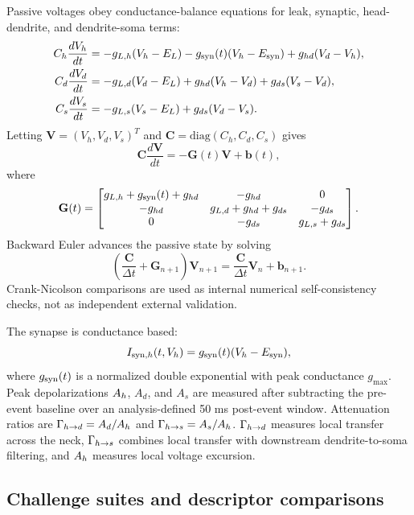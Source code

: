 Passive voltages obey conductance-balance equations for leak, synaptic, head-dendrite, and dendrite-soma terms:
\begin{align}
C_h\frac{dV_h}{dt} &=
-g_{L,h}(V_h-E_L)-g_{\mathrm{syn}}(t)(V_h-E_{\mathrm{syn}})+g_{hd}(V_d-V_h),\\
C_d\frac{dV_d}{dt} &=
-g_{L,d}(V_d-E_L)+g_{hd}(V_h-V_d)+g_{ds}(V_s-V_d),\\
C_s\frac{dV_s}{dt} &=
-g_{L,s}(V_s-E_L)+g_{ds}(V_d-V_s).
\end{align}
Letting $\mathbf{V}=(V_h,V_d,V_s)^T$ and $\mathbf{C}=\mathrm{diag}(C_h,C_d,C_s)$ gives
\begin{equation}
\mathbf{C}\frac{d\mathbf{V}}{dt}= -\mathbf{G}(t)\mathbf{V}+\mathbf{b}(t),
\end{equation}
where
\begin{equation}
\mathbf{G}(t)=
\begin{bmatrix}
g_{L,h}+g_{\mathrm{syn}}(t)+g_{hd} & -g_{hd} & 0\\
-g_{hd} & g_{L,d}+g_{hd}+g_{ds} & -g_{ds}\\
0 & -g_{ds} & g_{L,s}+g_{ds}
\end{bmatrix}.
\label{eq:matrix}
\end{equation}
Backward Euler advances the passive state by solving
\begin{equation}
\left(\frac{\mathbf{C}}{\Delta t}+\mathbf{G}_{n+1}\right)\mathbf{V}_{n+1}
=
\frac{\mathbf{C}}{\Delta t}\mathbf{V}_n+\mathbf{b}_{n+1}.
\end{equation}
Crank-Nicolson comparisons are used as internal numerical self-consistency checks, not as independent external validation.

The synapse is conductance based:
\begin{equation}
I_{\mathrm{syn},h}(t,V_h)=g_{\mathrm{syn}}(t)(V_h-E_{\mathrm{syn}}),
\end{equation}
where $g_{\mathrm{syn}}(t)$ is a normalized double exponential with peak conductance $g_{\max}$. Peak depolarizations $A_h$, $A_d$, and $A_s$ are measured after subtracting the pre-event baseline over an analysis-defined 50 ms post-event window. Attenuation ratios are $\Gamma_{h\rightarrow d}=A_d/A_h$ and $\Gamma_{h\rightarrow s}=A_s/A_h$. $\Gamma_{h\rightarrow d}$ measures local transfer across the neck, $\Gamma_{h\rightarrow s}$ combines local transfer with downstream dendrite-to-soma filtering, and $A_h$ measures local voltage excursion.

\subsection{Challenge suites and descriptor comparisons}

